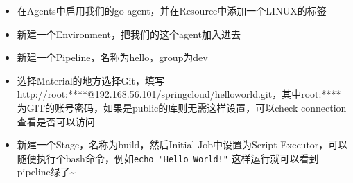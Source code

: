 \documentclass[12pt]{article}
\begin{document}
\begin{itemize}
\tightlist
\item
  在Agents中启用我们的go-agent，并在Resource中添加一个LINUX的标签
\item
  新建一个Environment，把我们的这个agent加入进去
\item
  新建一个Pipeline，名称为hello，group为dev
\item
  选择Material的地方选择Git，填写http://root:****@192.168.56.101/springcloud/helloworld.git，其中root:****为GIT的账号密码，如果是public的库则无需这样设置，可以check connection查看是否可以访问
\item
  新建一个Stage，名称为build，然后Initial Job中设置为Script Executor，可以随便执行个bash命令，例如\texttt{echo\ "Hello\ World!"} 这样运行就可以看到pipeline绿了\textsubscript{}\textasciitilde{}
\end{itemize}
\end{document}
